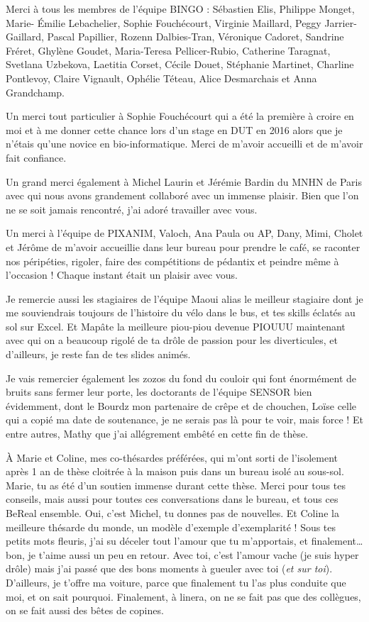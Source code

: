 \par Merci à tous les membres de l’équipe BINGO : Sébastien Elis, Philippe Monget, Marie- Émilie Lebachelier, Sophie Fouchécourt, Virginie Maillard, Peggy Jarrier-Gaillard, Pascal Papillier, Rozenn Dalbies-Tran, Véronique Cadoret, Sandrine Fréret, Ghylène Goudet, Maria-Teresa Pellicer-Rubio, Catherine Taragnat, Svetlana Uzbekova, Laetitia Corset, Cécile Douet, Stéphanie Martinet, Charline Pontlevoy, Claire Vignault, Ophélie Téteau, Alice Desmarchais et Anna Grandchamp.
\par Un merci tout particulier à Sophie Fouchécourt qui a été la première à croire en moi et à me donner cette chance lors d’un stage en DUT en 2016 alors que je n’étais qu’une novice en bio-informatique. Merci de m’avoir accueilli et de m’avoir fait confiance. 
\par Un grand merci également à Michel Laurin et Jérémie Bardin du MNHN de Paris avec qui nous avons grandement collaboré avec un immense plaisir. Bien que l’on ne se soit jamais rencontré, j’ai adoré travailler avec vous. 
\par Un merci à l’équipe de PIXANIM, Valoch, Ana Paula ou AP, Dany, Mimi, Cholet et Jérôme de m’avoir accueillie dans leur bureau pour prendre le café, se raconter nos péripéties, rigoler, faire des compétitions de pédantix et peindre même à l’occasion ! Chaque instant était un plaisir avec vous. 
\par Je remercie aussi les stagiaires de l’équipe Maoui alias le meilleur stagiaire dont je me souviendrais toujours de l’histoire du vélo dans le bus, et tes skills éclatés au sol sur Excel. Et Mapâte la meilleure piou-piou devenue PIOUUU maintenant avec qui on a beaucoup rigolé de ta drôle de passion pour les diverticules, et d’ailleurs, je reste fan de tes slides animés. 
\par Je vais remercier également les zozos du fond du couloir qui font énormément de bruits sans fermer leur porte, les doctorants de l’équipe SENSOR bien évidemment, dont le Bourdz mon partenaire de crêpe et de chouchen, Loïse celle qui a copié ma date de soutenance, je ne serais pas là pour te voir, mais force ! Et entre autres, Mathy que j’ai allégrement embêté en cette fin de thèse.
\par À Marie et Coline, mes co-thésardes préférées, qui m’ont sorti de l’isolement après 1 an de thèse cloitrée à la maison puis dans un bureau isolé au sous-sol. Marie, tu as été d’un soutien immense durant cette thèse. Merci pour tous tes conseils, mais aussi pour toutes ces conversations dans le bureau, et tous ces BeReal ensemble. Oui, c’est Michel, tu donnes pas de nouvelles. Et Coline la meilleure thésarde du monde, un modèle d’exemple d’exemplarité ! Sous tes petits mots fleuris, j’ai su déceler tout l’amour que tu m’apportais, et finalement… bon, je t’aime aussi un peu en retour. Avec toi, c’est l’amour vache (je suis hyper drôle) mais j’ai passé que des bons moments à gueuler avec toi (\textit{et sur toi}). D’ailleurs, je t’offre ma voiture, parce que finalement tu l’as plus conduite que moi, et on sait pourquoi. Finalement, à linera, on ne se fait pas que des collègues, on se fait aussi des bêtes de copines.
